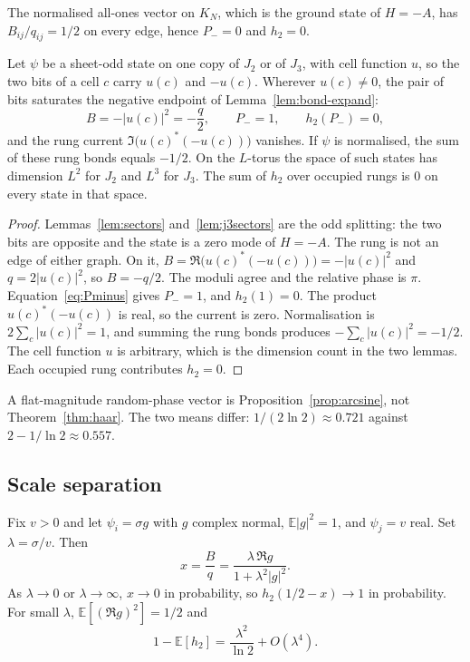\begin{proposition}
\label{prop:ground}
The normalised all-ones vector on \(K_N\), which is the ground state of
\(H=-A\), has \(B_{ij}/q_{ij}=1/2\) on every edge, hence \(P_-=0\) and \(h_2=0\).
\end{proposition}

\begin{proposition}
\label{prop:oddsat}
Let \(\psi\) be a sheet-odd state on one copy of \(J_2\) or of \(J_3\),
with cell function \(u\), so the two bits of a cell \(c\) carry \(u(c)\)
and \(-u(c)\).
Wherever \(u(c)\neq 0\), the pair of bits saturates the negative endpoint
of Lemma~\ref{lem:bond-expand}:
\[
B=-|u(c)|^2=-\frac q2,\qquad P_-=1,\qquad h_2(P_-)=0,
\]
and the rung current \(\Im\bigl(u(c)^*(-u(c))\bigr)\) vanishes.
If \(\psi\) is normalised, the sum of these rung bonds equals \(-1/2\).
On the \(L\)-torus the space of such states has dimension \(L^2\) for
\(J_2\) and \(L^3\) for \(J_3\).
The sum of \(h_2\) over occupied rungs is \(0\) on every state in that space.
\end{proposition}

\begin{proof}
Lemmas~\ref{lem:sectors} and~\ref{lem:j3sectors} are the odd splitting:
the two bits are opposite and the state is a zero mode of \(H=-A\).
The rung is not an edge of either graph.
On it,
\(B=\Re\bigl(u(c)^*(-u(c))\bigr)=-|u(c)|^2\) and \(q=2|u(c)|^2\),
so \(B=-q/2\).
The moduli agree and the relative phase is \(\pi\).
Equation~\eqref{eq:Pminus} gives \(P_-=1\), and \(h_2(1)=0\).
The product \(u(c)^*(-u(c))\) is real, so the current is zero.
Normalisation is \(2\sum_c|u(c)|^2=1\), and summing the rung bonds produces
\(-\sum_c|u(c)|^2=-1/2\).
The cell function \(u\) is arbitrary, which is the dimension count in the
two lemmas.
Each occupied rung contributes \(h_2=0\).
\end{proof}

A flat-magnitude random-phase vector is Proposition~\ref{prop:arcsine},
not Theorem~\ref{thm:haar}.
The two means differ:
\(1/(2\ln 2)\approx 0.721\) against \(2-1/\ln 2\approx 0.557\).

\subsection{Scale separation}

\begin{proposition}
\label{prop:lambda}
Fix \(v>0\) and let \(\psi_i=\sigma g\) with \(g\) complex normal,
\(\mathbb{E}|g|^2=1\), and \(\psi_j=v\) real.
Set \(\lambda=\sigma/v\). Then
\[
x=\frac{B}{q}=\frac{\lambda\,\Re g}{1+\lambda^2|g|^2}.
\]
As \(\lambda\to 0\) or \(\lambda\to\infty\), \(x\to 0\) in probability,
so \(h_2(1/2-x)\to 1\) in probability.
For small \(\lambda\), \(\mathbb{E}[(\Re g)^2]=1/2\) and
\[
1-\mathbb{E}[h_2]=\frac{\lambda^2}{\ln 2}+O(\lambda^4).
\]
\end{proposition}

